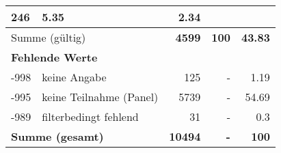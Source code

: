 \begin{longtable}{lXrrr}
       \num{246} &
       \num[round-mode=places,round-precision=2]{5,35} &
         \num[round-mode=places,round-precision=2]{2,34} \\
     \midrule
     \multicolumn{2}{l}{Summe (gültig)} &
       \textbf{\num{4599}} &
     \textbf{100} &
       \textbf{\num[round-mode=places,round-precision=2]{43,83}} \\
     \multicolumn{5}{l}{\textbf{Fehlende Werte}}\\
       -998 &
       keine Angabe &
         \num{125} &
        - &
         \num[round-mode=places,round-precision=2]{1,19} \\
       -995 &
       keine Teilnahme (Panel) &
         \num{5739} &
        - &
         \num[round-mode=places,round-precision=2]{54,69} \\
       -989 &
       filterbedingt fehlend &
         \num{31} &
        - &
         \num[round-mode=places,round-precision=2]{0,3} \\
     \midrule
     \multicolumn{2}{l}{\textbf{Summe (gesamt)}} &
          \textbf{\num{10494}} &
        \textbf{-} &
        \textbf{100} \\
     \bottomrule
     \end{longtable}
     
